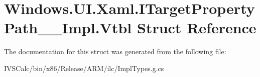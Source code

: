 \hypertarget{struct_windows_1_1_u_i_1_1_xaml_1_1_i_target_property_path_____impl_1_1_vtbl}{}\section{Windows.\+U\+I.\+Xaml.\+I\+Target\+Property\+Path\+\_\+\+\_\+\+Impl.\+Vtbl Struct Reference}
\label{struct_windows_1_1_u_i_1_1_xaml_1_1_i_target_property_path_____impl_1_1_vtbl}


The documentation for this struct was generated from the following file\+:\begin{DoxyCompactItemize}
\item 
I\+V\+S\+Calc/bin/x86/\+Release/\+A\+R\+M/ilc/Impl\+Types.\+g.\+cs\end{DoxyCompactItemize}
